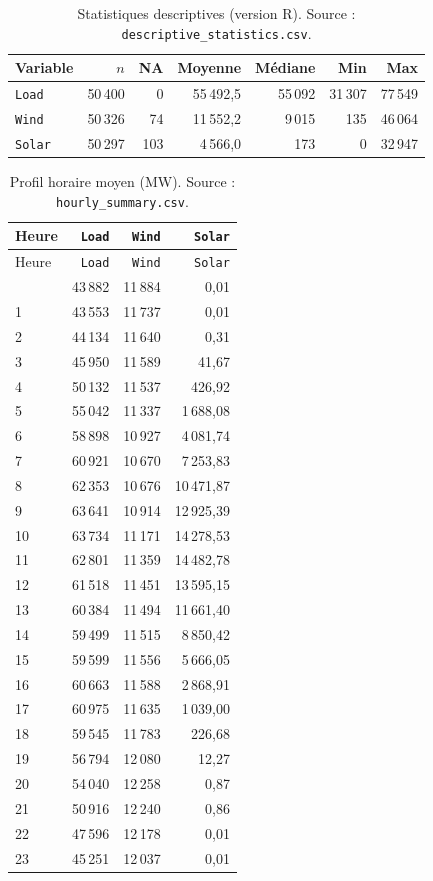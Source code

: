 \begin{table}[H]
\centering
\caption{Statistiques descriptives (version R).
Source : \texttt{descriptive\_statistics.csv}.}
\label{tab:desc_r}
\small
\begin{tabular}{lrrrrrr}
\toprule
Variable & $n$ & NA & Moyenne & Médiane & Min & Max \\
\midrule
\texttt{Load}  & 50\,400 & 0 & 55\,492{,}5 & 55\,092 & 31\,307 & 77\,549 \\
\texttt{Wind}  & 50\,326 & 74 & 11\,552{,}2 & 9\,015 & 135 & 46\,064 \\
\texttt{Solar} & 50\,297 & 103 & 4\,566{,}0 & 173 & 0 & 32\,947 \\
\bottomrule
\end{tabular}
\end{table}

{\small
\begin{longtable}{lrrr}
\caption{Profil horaire moyen (MW). Source : \texttt{hourly\_summary.csv}.}
\label{tab:hourly}\\
\toprule
Heure & \texttt{Load} & \texttt{Wind} & \texttt{Solar} \\
\midrule
\endfirsthead
\toprule
Heure & \texttt{Load} & \texttt{Wind} & \texttt{Solar} \\
\midrule
\endhead
\bottomrule
\endlastfoot
0 & 43\,882 & 11\,884 & 0{,}01 \\
1 & 43\,553 & 11\,737 & 0{,}01 \\
2 & 44\,134 & 11\,640 & 0{,}31 \\
3 & 45\,950 & 11\,589 & 41{,}67 \\
4 & 50\,132 & 11\,537 & 426{,}92 \\
5 & 55\,042 & 11\,337 & 1\,688{,}08 \\
6 & 58\,898 & 10\,927 & 4\,081{,}74 \\
7 & 60\,921 & 10\,670 & 7\,253{,}83 \\
8 & 62\,353 & 10\,676 & 10\,471{,}87 \\
9 & 63\,641 & 10\,914 & 12\,925{,}39 \\
10 & 63\,734 & 11\,171 & 14\,278{,}53 \\
11 & 62\,801 & 11\,359 & 14\,482{,}78 \\
12 & 61\,518 & 11\,451 & 13\,595{,}15 \\
13 & 60\,384 & 11\,494 & 11\,661{,}40 \\
14 & 59\,499 & 11\,515 & 8\,850{,}42 \\
15 & 59\,599 & 11\,556 & 5\,666{,}05 \\
16 & 60\,663 & 11\,588 & 2\,868{,}91 \\
17 & 60\,975 & 11\,635 & 1\,039{,}00 \\
18 & 59\,545 & 11\,783 & 226{,}68 \\
19 & 56\,794 & 12\,080 & 12{,}27 \\
20 & 54\,040 & 12\,258 & 0{,}87 \\
21 & 50\,916 & 12\,240 & 0{,}86 \\
22 & 47\,596 & 12\,178 & 0{,}01 \\
23 & 45\,251 & 12\,037 & 0{,}01 \\
\end{longtable}
}

